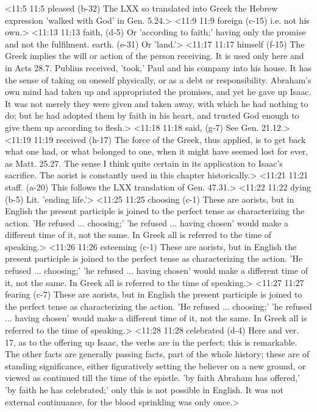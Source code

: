 <11:5 11:5  pleased (b-32)  The LXX so translated into Greek the Hebrew expression  'walked with God' in Gen. 5.24.>
<11:9 11:9  foreign (c-15)  i.e. not his own.>
<11:13 11:13  faith, (d-5)  Or 'according to faith;' having only the promise and not the  fulfilment.
  earth. (e-31)  Or 'land.'>
<11:17 11:17  himself (f-15)  The Greek implies the will or action of the person receiving.  It is used only here and in Acts 28.7. Publius received,  'took,' Paul and his company into his house. It has the sense  of taking on oneself physically, or as a debt or  responsibility. Abraham's own mind had taken up and  appropriated the promises, and yet he gave up Isaac. It was not  merely they were given and taken away, with which he had  nothing to do; but he had adopted them by faith in his heart,  and trusted God enough to give them up according to flesh.>
<11:18 11:18  said, (g-7)  See Gen. 21.12.>
<11:19 11:19  received (h-17)  The force of the Greek, thus applied, is to get back what one  had, or what belonged to one, when it might have seemed lost  for ever, as Matt. 25.27. The sense I think quite certain in  its application to Isaac's sacrifice. The aorist is constantly  used in this chapter historically.>
<11:21 11:21  staff. (a-20)  This follows the LXX translation of Gen. 47.31.>
<11:22 11:22  dying (b-5)  Lit. 'ending life.'>
<11:25 11:25  choosing (c-1)  These are aorists, but in English the present participle is  joined to the perfect tense as characterizing the action. 'He  refused ... choosing;' 'he refused ... having chosen' would  make a different time of it, not the same. In Greek all is  referred to the time of speaking.>
<11:26 11:26  esteeming (c-1)  These are aorists, but in English the present participle is  joined to the perfect tense as characterizing the action. 'He  refused ... choosing;' 'he refused ... having chosen' would  make a different time of it, not the same. In Greek all is  referred to the time of speaking.>
<11:27 11:27  fearing (c-7)  These are aorists, but in English the present participle is  joined to the perfect tense as characterizing the action. 'He  refused ... choosing;' 'he refused ... having chosen' would  make a different time of it, not the same. In Greek all is  referred to the time of speaking.>
<11:28 11:28  celebrated (d-4)  Here and ver. 17, as to the offering up Isaac, the verbs are  in the perfect; this is remarkable. The other facts are  generally passing facts, part of the whole history; these are  of standing significance, either figuratively setting the  believer on a new ground, or viewed as continued till the time  of the epistle. 'by faith Abraham has offered,' 'by faith he  has celebrated;' only this is not possible in English. It was  not external continuance, for the blood sprinkling was only  once.>
